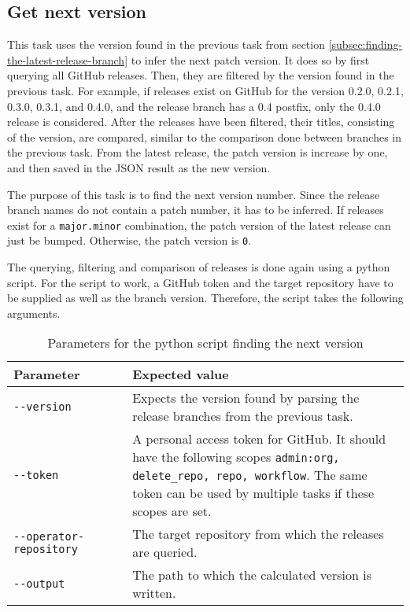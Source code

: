 \subsection{Get next version}\label{subsec:get-next-version}

This task uses the version found in the previous task from section \ref{subsec:finding-the-latest-release-branch} to infer the next patch version.
It does so by first querying all GitHub releases.
Then, they are filtered by the version found in the previous task.
For example, if releases exist on GitHub for the version 0.2.0, 0.2.1, 0.3.0, 0.3.1, and 0.4.0, and the release branch has a 0.4 postfix, only the 0.4.0 release is considered.
After the releases have been filtered, their titles, consisting of the version, are compared, similar to the comparison done between branches in the previous task.
From the latest release, the patch version is increase by one, and then saved in the JSON result as the new version.

The purpose of this task is to find the next version number.
Since the release branch names do not contain a patch number, it has to be inferred.
If releases exist for a \verb|major.minor| combination, the patch version of the latest release can just be bumped.
Otherwise, the patch version is \verb|0|.

The querying, filtering and comparison of releases is done again using a python script.
For the script to work, a GitHub token and the target repository have to be supplied as well as the branch version.
Therefore, the script takes the following arguments.

\begin{table}
    \centering
    \caption{Parameters for the python script finding the next version}
    \label{tab:py-finding-the-next-version}
    \begin{tabular}{p{0.3\linewidth}|p{0.7\linewidth}}
        Parameter & Expected value \\
        \hline
        \verb|--version| & Expects the version found by parsing the release branches from the previous task.  \\
        \verb|--token| &  A personal access token for GitHub. It should have the following scopes \verb|admin:org, delete_repo, repo, workflow|. The same token can be used by multiple tasks if these scopes are set. \\
        \verb|--operator-repository| & The target repository from which the releases are queried. \\
        \verb|--output| & The path to which the calculated version is written. \\
    \end{tabular}
\end{table}

